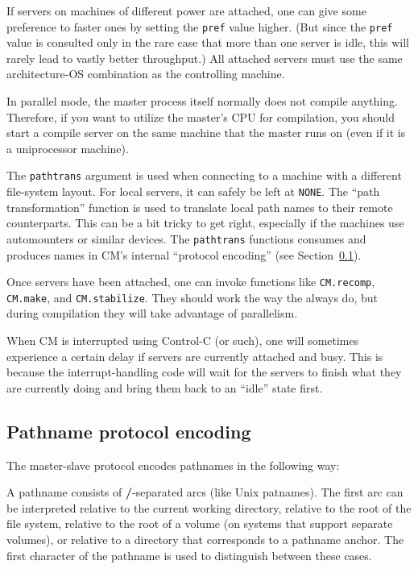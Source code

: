 \documentclass{article}
\begin{document}
If servers on machines of different power are attached, one can give
some preference to faster ones by setting the {\tt pref} value higher.
(But since the {\tt pref} value is consulted only in the rare case
that more than one server is idle, this will rarely lead to vastly
better throughput.) All attached servers must use the same
architecture-OS combination as the controlling machine.

In parallel mode, the master process itself normally does not compile
anything.  Therefore, if you want to utilize the master's CPU for
compilation, you should start a compile server on the same machine
that the master runs on (even if it is a uniprocessor machine).

The {\tt pathtrans} argument is used when connecting to a machine with
a different file-system layout.  For local servers, it can safely be
left at {\tt NONE}.  The ``path transformation'' function is used to
translate local path names to their remote counterparts.  This can be
a bit tricky to get right, especially if the machines use automounters
or similar devices.  The {\tt pathtrans} functions consumes and
produces names in CM's internal ``protocol encoding'' (see
Section~\ref{sec:pathencode}).

Once servers have been attached, one can invoke functions like
{\tt CM.recomp}, {\tt CM.make}, and {\tt CM.stabilize}.  They should
work the way the always do, but during compilation they will take
advantage of parallelism.

When CM is interrupted using Control-C (or such), one will sometimes
experience a certain delay if servers are currently attached and busy.
This is because the interrupt-handling code will wait for the servers
to finish what they are currently doing and bring them back to an
``idle'' state first.

\subsection{Pathname protocol encoding}
\label{sec:pathencode}

The master-slave protocol encodes pathnames in the following way:

A pathname consists of {\bf /}-separated arcs (like Unix patnames).
The first arc can be interpreted relative to the current working directory,
relative to the root of the file system, relative to the root of a
volume (on systems that support separate volumes), or relative to a
directory that corresponds to a pathname anchor.  The first character
of the pathname is used to distinguish between these cases.
\end{document}
